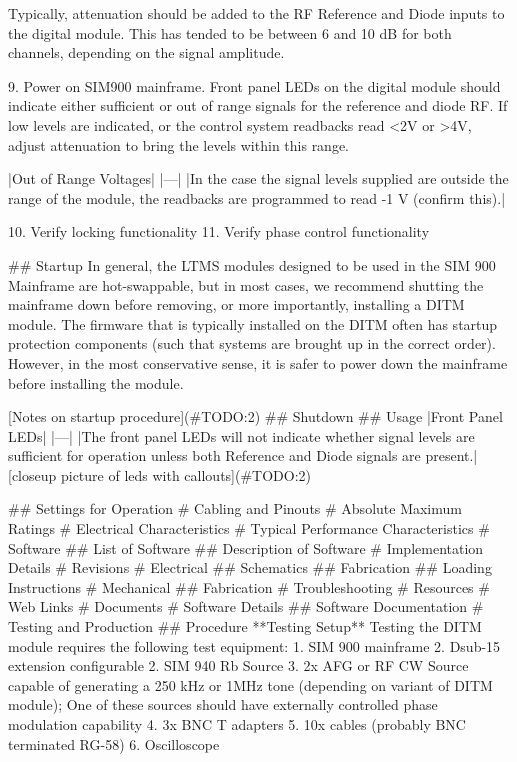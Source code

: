\documentclass{article}
\begin{document}
Typically, attenuation should be added to the RF Reference and Diode inputs to the digital module. This has tended to be between 6 and 10 dB for both channels, depending on the signal amplitude.

9. Power on SIM900 mainframe. Front panel LEDs on the digital module should indicate either sufficient or out of range signals for the reference and diode RF. If low levels are indicated, or the control system readbacks read <2V or >4V, adjust attenuation to bring the levels within this range.

|Out of Range Voltages|
|---|
|In the case the signal levels supplied are outside the range of the module, the readbacks are programmed to read -1 V (confirm this).|

10. Verify locking functionality
11. Verify phase control functionality

## Startup
In general, the LTMS modules designed to be used in the SIM 900 Mainframe are hot-swappable, but in most cases, we recommend shutting the mainframe down before removing, or more importantly, installing a DITM module. The firmware that is typically installed on the DITM often has startup protection components (such that systems are brought up in the correct order). However, in the most conservative sense, it is safer to power down the mainframe before installing the module.

[Notes on startup procedure](#TODO:2)
## Shutdown
## Usage
|Front Panel LEDs|
|---|
|The front panel LEDs will not indicate whether signal levels are sufficient for operation unless both Reference and Diode signals are present.|
[closeup picture of leds with callouts](#TODO:2)

## Settings for Operation
# Cabling and Pinouts
# Absolute Maximum Ratings
# Electrical Characteristics
# Typical Performance Characteristics
# Software
## List of Software
## Description of Software
# Implementation Details
# Revisions
# Electrical
## Schematics
## Fabrication
## Loading Instructions
# Mechanical
## Fabrication
# Troubleshooting
# Resources
# Web Links
# Documents
# Software Details
## Software Documentation
# Testing and Production
## Procedure
**Testing Setup**
Testing the DITM module requires the following test equipment:
1. SIM 900 mainframe
2. Dsub-15 extension configurable
2. SIM 940 Rb Source
3. 2x AFG or RF CW Source capable of generating a 250 kHz or 1MHz tone (depending on variant of DITM module); One of these sources should have externally controlled phase modulation capability
4. 3x BNC T adapters
5. 10x cables (probably BNC terminated RG-58)
6. Oscilloscope
\end{document}
